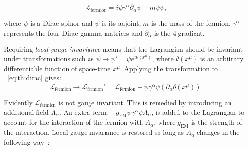 \begin{equation}
\label{eq:th:dirac}
\mathcal{L}_{\textrm{fermion}} = i\overline{\psi} \gamma^{\alpha} \partial_{\alpha} \psi - m\overline{\psi}\psi,
\end{equation}

where $\psi$ is a Dirac spinor and $\overline{\psi}$ is its adjoint, $m$ is the mass of the fermion, $\gamma^{\alpha}$ represents the four Dirac gamma matrices and $\partial_{\alpha}$ is the 4-gradient. 

Requiring \emph{local gauge invariance} means that the Lagrangian should be invariant under transformations such as
$\psi \rightarrow \psi'= \psi e^{i\theta(x^{\mu})}$, where $\theta(x^{\mu})$ is an arbitrary differentiable function of space-time $x^{\mu}$. Applying the transformation to \Eq~\ref{eq:th:dirac} gives:
\begin{equation}
\label{eq:th:dirac_lagrangian_not_invariant_local_gauge_transf}
\mathcal{L}_{\textrm{fermion}} \rightarrow \mathcal{L}_{\textrm{fermion}}'=  \mathcal{L}_{\textrm{fermion}} - \overline{\psi} \gamma^{\alpha} \psi (\partial_{\alpha} \theta(x^{\mu})).
\end{equation}

Evidently $\mathcal{L}_{\textrm{fermion}}$ is not gauge invariant.
This is remedied by introducing an additional field $A_\alpha$. An extra term, $- g_{\textrm{EM}}\overline{\psi}\gamma^{\alpha}\psi A_{\alpha}$, is added to the Lagrangian to account for the interaction of the fermion with $A_\alpha$,
where $g_{\textrm{EM}}$ is the strength of the interaction. Local gauge invariance is restored so long as $A_\alpha$ changes in the following way~\cite{griffiths2008introduction}: 

